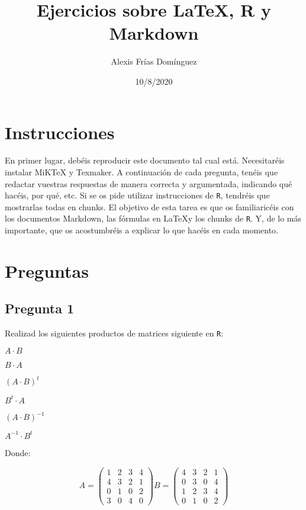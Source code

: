 \documentclass[
]{article}
\title{Ejercicios sobre LaTeX, R y Markdown}
\author{Alexis Frías Domínguez}
\date{10/8/2020}
\begin{document}
\maketitle

\hypertarget{instrucciones}{%
\section{Instrucciones}\label{instrucciones}}

En primer lugar, debéis reproducir este documento tal cual está.
Necesitaréis instalar MiKTeX y Texmaker. A continuación de cada
pregunta, tenéis que redactar vuestras respuestas de manera correcta y
argumentada, indicando qué hacéis, por qué, etc. Si se os pide utilizar
instrucciones de \texttt{R}, tendréis que mostrarlas todas en chunks. El
objetivo de esta tarea es que os familiaricéis con los documentos
Markdown, las fórmulas en \LaTeX y los chunks de \texttt{R}. Y, de lo
más importante, que os acostumbréis a explicar lo que hacéis en cada
momento.

\hypertarget{preguntas}{%
\section{Preguntas}\label{preguntas}}

\hypertarget{pregunta-1}{%
\subsection{Pregunta 1}\label{pregunta-1}}

Realizad los siguientes productos de matrices siguiente en \texttt{R}:

\begin{center}
$A\cdot B$

$B\cdot A$

$(A\cdot B)^t$

$B^t\cdot A$

$(A\cdot B)^{-1}$

$A^{-1}\cdot B^t$
\end{center}

Donde:

\begin{equation}
A =
\begin{pmatrix}
1 & 2 & 3 & 4\\
4 & 3 & 2 & 1\\
0 & 1 & 0 & 2\\
3 & 0 & 4 & 0
\end{pmatrix}
B = 
\begin{pmatrix}
4 & 3 & 2 & 1\\
0 & 3 & 0 & 4\\
1 & 2 & 3 & 4\\
0 & 1 & 0 & 2 
\end{pmatrix}
\end{equation}
\end{document}
